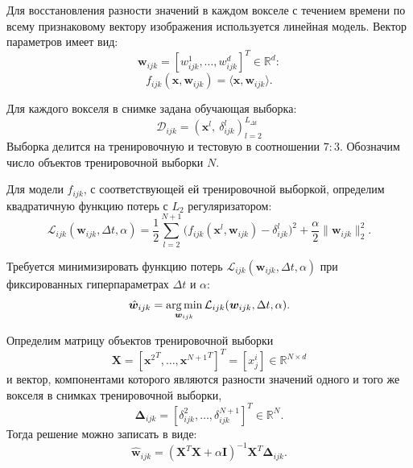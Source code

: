 \documentclass[12pt,twoside]{article}
\begin{document}
Для восстановления разности значений в каждом вокселе с течением времени по всему признаковому вектору изображения используется линейная модель. Вектор параметров имеет вид:
\[ \bm{w}_{ijk} = [w_{ijk}^1, \ldots, w_{ijk}^{d}]^{T} \in \mathbb{R}^{d}: \]
\begin{equation}
	\label{f_ijk}
	f_{ijk}(\bm{x}, \bm{w}_{ijk}) = \langle \bm{x}, \bm{w}_{ijk} \rangle.
\end{equation}

Для каждого вокселя в снимке задана обучающая выборка:
\begin{equation}
    \mathcal{D}_{ijk} = \left(\bm{x}^l,~\delta^{l}_{ijk} \right)^{ L_{\Delta t}}_{l = 2}
\end{equation}
Выборка делится на тренировочную и тестовую в соотношении $7 : 3$. 
Обозначим число объектов тренировочной выборки $N$.

Для модели $f_{ijk}$, с соответствующей ей тренировочной выборкой,
определим квадратичную функцию потерь с $L_2$ регуляризатором:
\begin{equation}
	\label{Loss}
	\mathcal{L}_{ijk}(\bm{w}_{ijk}, \Delta t, \alpha) = \frac{1}{2} \sum\limits_{l = 2}^{N+1} \big(f_{ijk}(\bm{x}^l, \bm{w}_{ijk}) - \delta^{l}_{ijk}\big)^2 + \frac{\alpha}{2} \|\bm{w}_{ijk}\|^2_2.
\end{equation}

Требуется минимизировать функцию потерь $\mathcal{L}_{ijk}(\bm{w}_{ijk}, \Delta t, \alpha)$ при фиксированных гиперпараметрах $\Delta t$ и $\alpha$:
\begin{equation}
	\label{main_Problem}
	\hat{\bm{w}}_{ijk} = \argmin_{\bm{w}_{ijk}} \mathcal{L}_{ijk}(\bm{w}_{ijk}, \Delta t, \alpha).
\end{equation}

Определим матрицу объектов тренировочной выборки
\begin{equation}
\label{X}
    \bm{X} = [{\bm{x}^2}^T, \dots, {\bm{x}^{N+1}}^T]^T = [x^i_j] \in \mathbb{R}^{N \times d}
\end{equation}
и вектор, компонентами которого являются разности значений одного и того же вокселя в снимках тренировочной выборки,
\begin{equation}
\label{Delta}
    \bm{\Delta}_{ijk} = [\delta^{2}_{ijk}, \dots, \delta^{N+1}_{ijk}]^T \in \mathbb{R}^{N}.
\end{equation}
Тогда решение можно записать в виде:
\begin{equation}
\label{weights}
    \hat{\bm{w}}_{ijk} = (\bm{X}^T \bm{X} + \alpha \mathbf{I})^{-1} \bm{X}^T \mathbf{\Delta}_{ijk}.
\end{equation}
\end{document}
